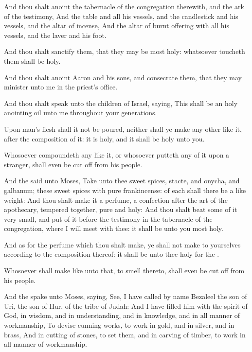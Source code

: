 \Verse And thou shalt anoint the tabernacle of the congregation therewith, and the ark of the testimony, \Verse And the table and all his vessels, and the candlestick and his vessels, and the altar of incense, \Verse And the altar of burnt offering with all his vessels, and the laver and his foot.

\Verse And thou shalt sanctify them, that they may be most holy: whatsoever toucheth them shall be holy.

\Verse And thou shalt anoint Aaron and his sons, and consecrate them, that they may minister unto me in the priest's office.

\Verse And thou shalt speak unto the children of Israel, saying, This shall be an holy anointing oil unto me throughout your generations.

\Verse Upon man's flesh shall it not be poured, neither shall ye make any other like it, after the composition of it: it is holy, and it shall be holy unto you.

\Verse Whosoever compoundeth any like it, or whosoever putteth any of it upon a stranger, shall even be cut off from his people.

\Verse And the \LORD said unto Moses, Take unto thee sweet spices, stacte, and onycha, and galbanum; these sweet spices with pure frankincense: of each shall there be a like weight: \Verse And thou shalt make it a perfume, a confection after the art of the apothecary, tempered together, pure and holy: \Verse And thou shalt beat some of it very small, and put of it before the testimony in the tabernacle of the congregation, where I will meet with thee: it shall be unto you most holy.

\Verse And as for the perfume which thou shalt make, ye shall not make to yourselves according to the composition thereof: it shall be unto thee holy for the \LORD.

\Verse Whosoever shall make like unto that, to smell thereto, shall even be cut off from his people.

\Chapter
\Verse And the \LORD spake unto Moses, saying, \Verse See, I have called by name Bezaleel the son of Uri, the son of Hur, of the tribe of Judah: \Verse And I have filled him with the spirit of God, in wisdom, and in understanding, and in knowledge, and in all manner of workmanship, \Verse To devise cunning works, to work in gold, and in silver, and in brass, \Verse And in cutting of stones, to set them, and in carving of timber, to work in all manner of workmanship.

